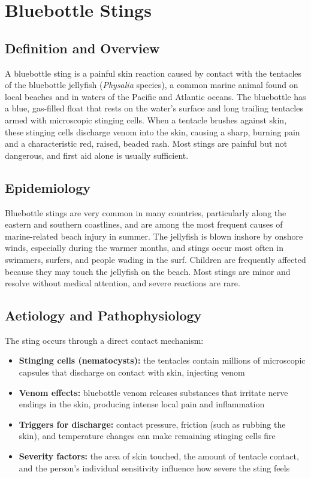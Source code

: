 \chapter{Bluebottle Stings}

\section*{Definition and Overview}
A bluebottle sting is a painful skin reaction caused by contact with the tentacles of the bluebottle jellyfish (\textit{Physalia} species), a common marine animal found on local beaches and in waters of the Pacific and Atlantic oceans. The bluebottle has a blue, gas-filled float that rests on the water's surface and long trailing tentacles armed with microscopic stinging cells. When a tentacle brushes against skin, these stinging cells discharge venom into the skin, causing a sharp, burning pain and a characteristic red, raised, beaded rash. Most stings are painful but not dangerous, and first aid alone is usually sufficient.

\section*{Epidemiology}
Bluebottle stings are very common in many countries, particularly along the eastern and southern coastlines, and are among the most frequent causes of marine-related beach injury in summer. The jellyfish is blown inshore by onshore winds, especially during the warmer months, and stings occur most often in swimmers, surfers, and people wading in the surf. Children are frequently affected because they may touch the jellyfish on the beach. Most stings are minor and resolve without medical attention, and severe reactions are rare.

\section*{Aetiology and Pathophysiology}
The sting occurs through a direct contact mechanism:

\begin{itemize}
    \item \textbf{Stinging cells (nematocysts):} the tentacles contain millions of microscopic capsules that discharge on contact with skin, injecting venom
    \item \textbf{Venom effects:} bluebottle venom releases substances that irritate nerve endings in the skin, producing intense local pain and inflammation
    \item \textbf{Triggers for discharge:} contact pressure, friction (such as rubbing the skin), and temperature changes can make remaining stinging cells fire
    \item \textbf{Severity factors:} the area of skin touched, the amount of tentacle contact, and the person's individual sensitivity influence how severe the sting feels
\end{itemize}

